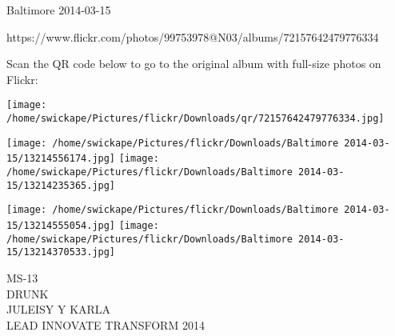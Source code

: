 \documentclass[10pt,letterpaper]{article}
\begin{document}
Baltimore 2014-03-15

https://www.flickr.com/photos/99753978@N03/albums/72157642479776334

Scan the QR code below to go to the original album with full-size photos on Flickr:

\texttt{[image: /home/swickape/Pictures/flickr/Downloads/qr/72157642479776334.jpg]}
\pagebreak

\texttt{[image: /home/swickape/Pictures/flickr/Downloads/Baltimore 2014-03-15/13214556174.jpg]}
\texttt{[image: /home/swickape/Pictures/flickr/Downloads/Baltimore 2014-03-15/13214235365.jpg]}

\texttt{[image: /home/swickape/Pictures/flickr/Downloads/Baltimore 2014-03-15/13214555054.jpg]}
\texttt{[image: /home/swickape/Pictures/flickr/Downloads/Baltimore 2014-03-15/13214370533.jpg]}

MS{-}13\\
DRUNK\\
JULEISY Y KARLA\\
LEAD INNOVATE TRANSFORM 2014
\pagebreak
\end{document}
